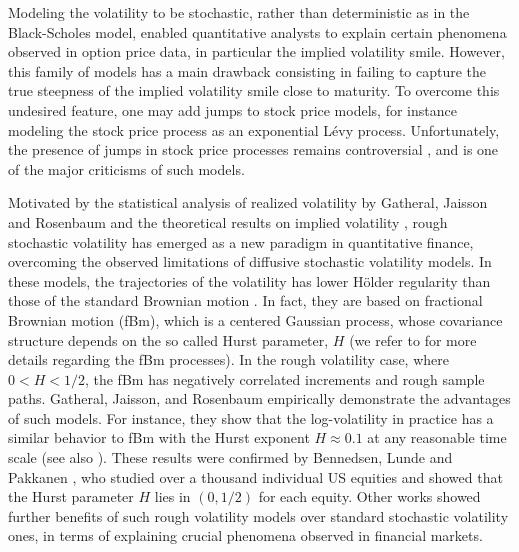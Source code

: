 Modeling the volatility to be stochastic, rather than deterministic as in the Black-Scholes model, enabled quantitative analysts to  explain certain phenomena observed in option price data, in particular the implied volatility smile. However, this family of models has a  main drawback consisting in failing  to capture the true steepness of the implied volatility smile close to maturity. To overcome this undesired feature, one may add jumps to stock price models, for instance modeling the stock price process as an exponential L\'evy process. Unfortunately, the presence of jumps in stock price processes remains controversial \cite{christensen2014fact,bajgrowicz2015jumps}, and is one of the major criticisms of such models. 



Motivated by the statistical analysis of realized volatility by Gatheral, Jaisson and Rosenbaum \cite{gatheral2014volatility} and the theoretical results on implied volatility    \cite{alos2007short,fukasawa2011asymptotic}, rough stochastic volatility has emerged as a new paradigm in quantitative finance, overcoming the observed limitations of  diffusive stochastic volatility models. In these models, the trajectories of the volatility  has lower H\"older regularity than those of the standard Brownian motion \cite{gatheral2014volatility,bayer2016pricing}. In fact, they are based on fractional Brownian motion (fBm), which  is a centered Gaussian process, whose covariance structure depends on  the so called Hurst parameter, $H$ (we refer to  \cite{mandelbrot1968fractional,coutin07introduction,biagini2008stochastic} for more details regarding the fBm processes). In the rough volatility case, where $0<H<1/2$, the fBm has negatively correlated increments and rough sample paths.   Gatheral, Jaisson, and Rosenbaum \cite{gatheral2014volatility}  empirically demonstrate the advantages of such models. For instance, they show that the log-volatility in practice has a similar behavior to  fBm with the Hurst exponent $H \approx 0.1$ at any reasonable time scale (see also  \cite{gatheral2014volatility_2}).  These results were confirmed  by Bennedsen, Lunde and Pakkanen \cite{bennedsen2016decoupling}, who studied over a thousand individual US equities and showed that the Hurst parameter $H$ lies in $(0,1/2)$ for each equity. Other  works \cite{gatheral2014volatility,bennedsen2016decoupling,bayer2016pricing} showed further benefits of  such rough volatility models over  standard stochastic volatility ones,   in terms of explaining crucial phenomena  observed in  financial markets.
 
